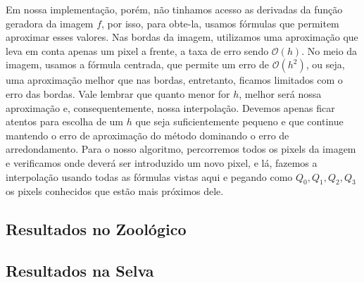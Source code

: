 \documentclass{article}
\begin{document}
	Em nossa implementação, porém, não tinhamos acesso as derivadas da função geradora da imagem $f$, por isso, para obte-la, usamos fórmulas que permitem aproximar esses valores. Nas bordas da imagem, utilizamos uma aproximação que leva em conta apenas um pixel a frente, a taxa de erro sendo $\mathcal{O}(h)$. No meio da imagem, usamos a fórmula centrada, que permite um erro de $\mathcal{O}(h^2)$, ou seja, uma aproximação melhor que nas bordas, entretanto, ficamos limitados com o erro das bordas. Vale lembrar que quanto menor for $h$, melhor será nossa aproximação e, consequentemente, nossa interpolação. Devemos apenas ficar atentos para escolha de um $h$ que seja suficientemente pequeno e que continue mantendo o erro de aproximação do método dominando o erro de arredondamento.
	Para o nosso algoritmo, percorremos todos os pixels da imagem e verificamos onde deverá ser introduzido um novo pixel, e lá, fazemos a interpolação usando todas as fórmulas vistas aqui e pegando como $Q_{0}, Q_{1}, Q_{2}, Q_{3}$ os pixels conhecidos que estão mais próximos dele.
		\subsection{Resultados no Zoológico}
		\subsection{Resultados na Selva}
\end{document}

